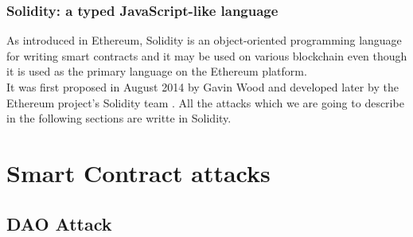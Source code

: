 \subsubsection{Solidity: a typed JavaScript-like language}
As introduced in Ethereum, Solidity is an object-oriented programming language for writing smart contracts and it may be used on various blockchain even though it is used as the primary language on the Ethereum platform.
\\It was first proposed in August 2014 by Gavin Wood and developed later by the Ethereum project's Solidity team \cite{solidity}. 
All the attacks which we are going to describe in the following sections are writte in Solidity. 

\section{Smart Contract attacks}
\subsection{DAO Attack}
